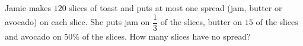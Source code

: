 Jamie makes $120$ slices of toast and puts at most one spread (jam, butter or avocado) on each slice. She puts jam on $\dfrac13$ of the slices, butter on $15$ of the slices and avocado on $50\%$ of the slices. How many slices have no spread?
